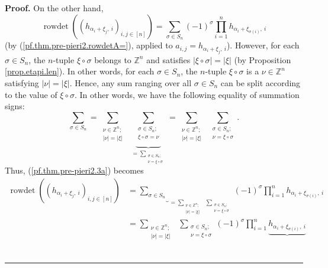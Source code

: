 \documentclass[numbers=enddot,12pt,final,onecolumn,notitlepage,english]{scrartcl}%
\theoremstyle{definition}
\newenvironment{proof}[1][Proof]{\noindent\textbf{#1.} }{\ \rule{0.5em}{0.5em}}
\let\sumnonlimits\sum
\let\prodnonlimits\prod
\renewcommand{\sum}{\sumnonlimits\limits}
\renewcommand{\prod}{\prodnonlimits\limits}
\newenvironment{verlong}{}{}
\begin{document}
\begin{verlong}
\begin{proof}
On the other hand,%
\begin{equation}
\operatorname*{rowdet}\left(  \left(  h_{\alpha_{i}+\xi_{j},\ i}\right)
_{i,j\in\left[  n\right]  }\right)  =\sum_{\sigma\in S_{n}}\left(  -1\right)
^{\sigma}\prod_{i=1}^{n}h_{\alpha_{i}+\xi_{\sigma\left(  i\right)  },\ i}
\label{pf.thm.pre-pieri2.3a}%
\end{equation}
(by (\ref{pf.thm.pre-pieri2.rowdetA=}), applied to $a_{i,j}=h_{\alpha_{i}%
+\xi_{j},\ i}$). However, for each $\sigma\in S_{n}$, the $n$-tuple $\xi
\circ\sigma$ belongs to $\mathbb{Z}^{n}$ and satisfies $\left\vert \xi
\circ\sigma\right\vert =\left\vert \xi\right\vert $ (by Proposition
\ref{prop.etapi.len}). In other words, for each $\sigma\in S_{n}$, the
$n$-tuple $\xi\circ\sigma$ is a $\nu\in\mathbb{Z}^{n}$ satisfying $\left\vert
\nu\right\vert =\left\vert \xi\right\vert $. Hence, any sum ranging over all
$\sigma\in S_{n}$ can be split according to the value of $\xi\circ\sigma$. In
other words, we have the following equality of summation signs:%
\[
\sum_{\sigma\in S_{n}}=\sum_{\substack{\nu\in\mathbb{Z}^{n};\\\left\vert
\nu\right\vert =\left\vert \xi\right\vert }}\ \ \underbrace{\sum
_{\substack{\sigma\in S_{n};\\\xi\circ\sigma=\nu}}}_{=\sum_{\substack{\sigma
\in S_{n};\\\nu=\xi\circ\sigma}}}=\sum_{\substack{\nu\in\mathbb{Z}%
^{n};\\\left\vert \nu\right\vert =\left\vert \xi\right\vert }}\ \ \sum
_{\substack{\sigma\in S_{n};\\\nu=\xi\circ\sigma}}.
\]
Thus, (\ref{pf.thm.pre-pieri2.3a}) becomes%
\begin{align*}
\operatorname*{rowdet}\left(  \left(  h_{\alpha_{i}+\xi_{j},\ i}\right)
_{i,j\in\left[  n\right]  }\right)   &  =\underbrace{\sum_{\sigma\in S_{n}}%
}_{=\sum_{\substack{\nu\in\mathbb{Z}^{n};\\\left\vert \nu\right\vert
=\left\vert \xi\right\vert }}\ \ \sum_{\substack{\sigma\in S_{n};\\\nu
=\xi\circ\sigma}}}\left(  -1\right)  ^{\sigma}\prod_{i=1}^{n}h_{\alpha_{i}%
+\xi_{\sigma\left(  i\right)  },\ i}\\
&  =\sum_{\substack{\nu\in\mathbb{Z}^{n};\\\left\vert \nu\right\vert
=\left\vert \xi\right\vert }}\ \ \sum_{\substack{\sigma\in S_{n};\\\nu
=\xi\circ\sigma}}\left(  -1\right)  ^{\sigma}\prod_{i=1}^{n}%
\underbrace{h_{\alpha_{i}+\xi_{\sigma\left(  i\right)  },\ i}}%

\end{align*}
\end{proof}
\end{verlong}
\end{document}
